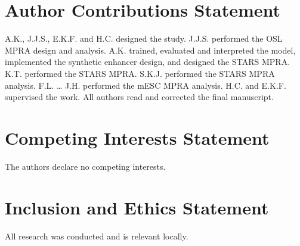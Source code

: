 \section{Author Contributions Statement}

A.K., J.J.S., E.K.F. and H.C. designed the study. J.J.S. performed the OSL MPRA design and analysis. A.K. trained, evaluated and interpreted the model, implemented the synthetic enhancer design, and designed the STARS MPRA. K.T. performed the STARS MPRA. S.K.J. performed the STARS MPRA analysis. F.L. … J.H. performed the mESC MPRA analysis. H.C. and E.K.F. supervised the work. All authors read and corrected the final manuscript.

\section{Competing Interests Statement}

The authors declare no competing interests.

\section{Inclusion and Ethics Statement}

All research was conducted and is relevant locally.
